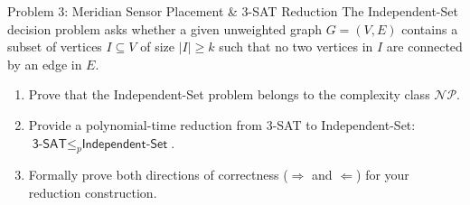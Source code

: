 \documentclass[11pt, a4paper]{article}
\begin{document}
\begin{problembox}{Problem 3: Meridian Sensor Placement \& 3-SAT Reduction}
  The \textsf{Independent-Set} decision problem asks whether a given unweighted graph $G = (V, E)$ contains a subset of vertices $I \subseteq V$ of size $|I| \ge k$ such that no two vertices in $I$ are connected by an edge in $E$.

  \begin{enumerate}[label=\textbf{(\alph*)}, leftmargin=1.5em, itemsep=0.5pt]
    \item Prove that the \textsf{Independent-Set} problem belongs to the complexity class $\mathcal{NP}$.
    \item Provide a polynomial-time reduction from \textsf{3-SAT} to \textsf{Independent-Set}: $\textsf{3-SAT} \le_p \textsf{Independent-Set}$.
    \item Formally prove both directions of correctness ($\Rightarrow$ and $\Leftarrow$) for your reduction construction.
  \end{enumerate}
\end{problembox}

\vspace{2pt}
\end{document}
